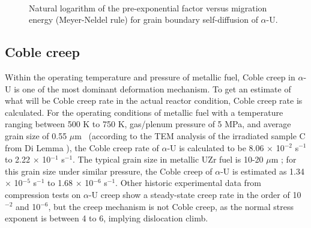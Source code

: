 \documentclass[review]{elsarticle}
\providecommand{\DIFaddbeginFL}{} %
\providecommand{\DIFaddendFL}{} %
\providecommand{\DIFdelbeginFL}{} %
\providecommand{\DIFdelendFL}{} %
\newcommand{\DIFscaledelfig}{0.5}
\newlength{\DIFdelgraphicswidth} %
\newlength{\DIFdelgraphicsheight} %
\newcommand{\DIFaddincludegraphics}[2][]{{\color{blue}\fbox{\DIFOincludegraphics[#1]{#2}}}} %
\newcommand{\DIFdelincludegraphics}[2][]{%
\sbox{\DIFdelgraphicsbox}{\DIFOincludegraphics[#1]{#2}}%
\settoboxwidth{\DIFdelgraphicswidth}{\DIFdelgraphicsbox} %
\settoboxtotalheight{\DIFdelgraphicsheight}{\DIFdelgraphicsbox} %
\scalebox{\DIFscaledelfig}{%
\parbox[b]{\DIFdelgraphicswidth}{\usebox{\DIFdelgraphicsbox}\\[-\baselineskip] \rule{\DIFdelgraphicswidth}{0em}}\llap{\resizebox{\DIFdelgraphicswidth}{\DIFdelgraphicsheight}{%
\setlength{\unitlength}{\DIFdelgraphicswidth}%
\begin{picture}(1,1)%
\thicklines\linethickness{2pt} %
{\color[rgb]{1,0,0}\put(0,0){\framebox(1,1){}}}%
{\color[rgb]{1,0,0}\put(0,0){\line( 1,1){1}}}%
{\color[rgb]{1,0,0}\put(0,1){\line(1,-1){1}}}%
\end{picture}%
}\hspace*{3pt}}} %
} %
\DeclareRobustCommand{\DIFaddbeginFL}{\DIFOaddbeginFL \let\includegraphics\DIFaddincludegraphics} %
\DeclareRobustCommand{\DIFaddendFL}{\DIFOaddendFL \let\includegraphics\DIFOincludegraphics} %
\DeclareRobustCommand{\DIFdelbeginFL}{\DIFOdelbeginFL \let\includegraphics\DIFdelincludegraphics} %
\DeclareRobustCommand{\DIFdelendFL}{\DIFOaddendFL \let\includegraphics\DIFOincludegraphics} %
\begin{document}
\begin{figure}[h!]
\centering
\DIFdelbeginFL %
\DIFdelendFL \DIFaddbeginFL {}\DIFaddendFL \\
\caption{Natural logarithm of the pre-exponential factor versus migration energy (Meyer-Neldel rule) for grain boundary self-diffusion of $\alpha$-U.}
\label{fig:compan}
\end{figure}

\subsection{Coble creep}

Within the operating temperature and pressure of metallic fuel, Coble creep in $\alpha$-U is one of the most dominant deformation mechanism. To get an estimate of what will be Coble creep rate in the actual reactor condition, Coble creep rate is calculated. For the operating conditions of metallic fuel \cite{recent_review} with a temperature ranging between 500 K to 750 K, gas/plenum pressure of 5 MPa, and average grain size of 0.55 $\mu$m \ (according to the TEM analysis of the irradiated sample C from Di Lemma \cite{DILEMMA2020152467}), the Coble creep rate of $\alpha$-U is calculated to be 8.06 $\times$ 10$^{-2}$ s$^{-1}$ to 2.22 $\times$ 10$^{-1}$ s$^{-1}$. The typical grain size in metallic UZr fuel is 10-20 $\mu$m \cite{osti_1469797}; for this grain size under similar pressure, the Coble creep of $\alpha$-U is estimated as 1.34 $\times$ 10$^{-5}$ s$^{-1}$ to 1.68 $\times$ 10$^{-6}$ s$^{-1}$. Other historic experimental data \cite{ROBINSON1973293} from compression tests on $\alpha$-U creep show a steady-state creep rate in the order of 10$^{-2}$ and 10$^{-6}$, but the creep mechanism is not Coble creep, as the normal stress exponent is between 4 to 6, implying dislocation climb. 
\end{document}
